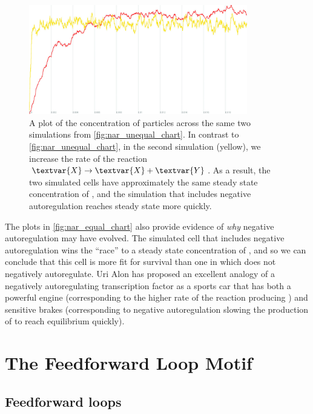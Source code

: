\begin{figure}[h]
\centering
\mySfFamily
\includegraphics[width = 0.85\textwidth]{../images_CMYK/cellblender_nar_equal_chart_white}
\caption{A plot of the concentration of  particles across the same two simulations from \autoref{fig:nar_unequal_chart}. In contrast to \autoref{fig:nar_unequal_chart}, in the second simulation (yellow), we increase the rate of the reaction $\textvar{X} \rightarrow \textvar{X} + \textvar{Y}$.  As a result, the two simulated cells have approximately the same steady state concentration of , and the simulation that includes negative autoregulation reaches steady state more quickly.}
\label{fig:nar_equal_chart}
\end{figure}

The plots in \autoref{fig:nar_equal_chart} also provide evidence of \textit{why} negative autoregulation may have evolved. The simulated cell that includes negative autoregulation wins the ``race'' to a steady state concentration of , and so we can conclude that this cell is more fit for survival than one in which  does not negatively autoregulate. Uri Alon has proposed an excellent analogy of a negatively autoregulating transcription factor as a sports car that has both a powerful engine (corresponding to the higher rate of the reaction producing ) and sensitive brakes (corresponding to negative autoregulation slowing the production of  to reach equilibrium quickly).\\

\FloatBarrier
{}

\section{The Feedforward Loop Motif}
\label{sec:the_feedforward_loop_motif}

\subsection{Feedforward loops}

